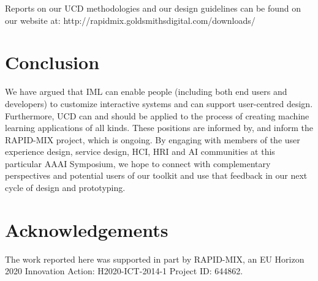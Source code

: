 \documentclass[letterpaper]{article}
\begin{document}
Reports on our UCD methodologies and our design guidelines can be found on our website at: http://rapidmix.goldsmithsdigital.com/downloads/

\section{Conclusion} 
We have argued that IML can enable people (including both end users and developers) to customize interactive systems and can support user-centred design. Furthermore, UCD can and should be applied to the process of creating machine learning applications of all kinds. These positions are informed by, and inform the RAPID-MIX project, which is ongoing. By engaging with members of the user experience design, service design, HCI, HRI and AI communities at this particular AAAI Symposium, we hope to connect with complementary perspectives and potential users of our toolkit and use that feedback in our next cycle of design and prototyping.

\section{Acknowledgements}
The work reported here was supported in part by RAPID-MIX, an EU Horizon 2020 Innovation Action: H2020-ICT-2014-1 Project ID: 644862.



\end{document}
